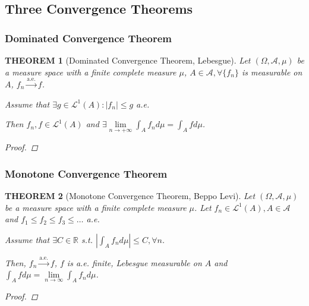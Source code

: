 \documentclass[12pt]{article}
\theoremstyle{blueplain}
\newtheorem{theorem}{THEOREM}[section]
\theoremstyle{bluedef}
\theoremstyle{blueremark}
\newcommand{\R}{\mathbb{R}}
\numberwithin{equation}{section}
\begin{document}
\clearpage

\subsection{Three Convergence Theorems}

\subsubsection{Dominated Convergence Theorem}

\begin{theorem}[Dominated Convergence Theorem, Lebesgue]

  Let $(\Omega, \mathcal{A}, \mu)$ be a measure space with a finite complete measure $\mu$, $A \in \mathcal{A}, \forall \{f_n\}$ is measurable on $A$, $f_n \overset{\text{a.e.}}{\rightarrow} f$.

  Assume that $\exists g \in \mathcal{L}^1(A): |f_n| \leq g$ a.e.

  Then $f_n, f \in \mathcal{L}^1(A)$ and $\exists \lim\limits_{n \to +\infty} \int_A f_n d\mu = \int_A f d\mu$.

  \begin{proof}




  \end{proof}
\end{theorem}

\subsubsection{Monotone Convergence Theorem}

\begin{theorem}[Monotone Convergence Theorem, Beppo Levi]

  Let $(\Omega, \mathcal{A}, \mu)$ be a measure space with a finite complete measure $\mu$. Let $f_n \in \mathcal{L}^1(A), A \in \mathcal{A}$ and $f_1 \leq f_2 \leq f_3 \leq \ldots$ a.e.

  Assume that $\exists C \in \R$ s.t. $|\int_A f_n d\mu| \leq C, \forall n$.

  Then, $f_n \overset{\text{a.e.}}{\rightarrow} f$, $f$ is a.e. finite, Lebesgue measurable on $A$ and $\int_A f d\mu = \lim\limits_{n \to \infty} \int_A f_n d\mu$.

  \begin{proof}




  \end{proof}
\end{theorem}
\end{document}
